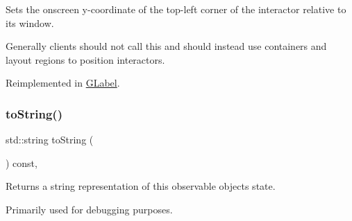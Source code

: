 Sets the onscreen y-\/coordinate of the top-\/left corner of the interactor relative to its window. 

Generally clients should not call this and should instead use containers and layout regions to position interactors. 

Reimplemented in \mbox{\hyperlink{classGLabel_a0b738606c7aca5c472b66c4e55b3c685}{G\+Label}}.

\mbox{\label{classGObservable_a1fe5121d6528fdea3f243321b3fa3a49}} 
\subsubsection{\texorpdfstring{to\+String()}{toString()}}
{\footnotesize\ttfamily std\+::string to\+String (\begin{DoxyParamCaption}{ }\end{DoxyParamCaption}) const\hspace{0.3cm}{\ttfamily [virtual]}, {\ttfamily [inherited]}}



Returns a string representation of this observable object\textquotesingle{}s state. 

Primarily used for debugging purposes. 